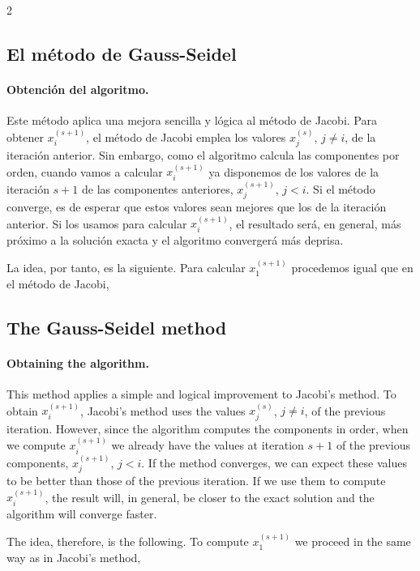\begin{paracol}{2}
\subsection{El método de Gauss-Seidel} 
\paragraph{Obtención del algoritmo.} Este método aplica una mejora sencilla y lógica al método de Jacobi. Para obtener $x_i^{(s+1)}$, el método de Jacobi emplea los valores $x_j^{(s)}$, $j\neq i$, de la iteración anterior. Sin embargo, como el algoritmo calcula las componentes por orden, cuando vamos a calcular $x_i^{(s+1)}$ ya disponemos de los valores de la iteración $s+1$ de las componentes anteriores, $x_j^{(s+1)}$, $j<i$. Si el método converge, es de esperar que estos valores sean mejores que los de la iteración anterior. Si los usamos para calcular $x_i^{(s+1)}$, el resultado será, en general, más próximo a la solución exacta y el algoritmo convergerá más deprisa.

La idea, por tanto, es la siguiente. Para calcular $x_1^{(s+1)}$ procedemos igual que en el método de Jacobi,

\switchcolumn
\subsection{The Gauss-Seidel method} 
\paragraph{Obtaining the algorithm.} This method applies a simple and logical improvement to Jacobi's method. To obtain $x_i^{(s+1)}$, Jacobi's method uses the values $x_j^{(s)}$, $j\neq i$, of the previous iteration. However, since the algorithm computes the components in order, when we compute $x_i^{(s+1)}$ we already have the values at iteration $s+1$ of the previous components, $x_j^{(s+1)}$, $j<i$. If the method converges, we can expect these values to be better than those of the previous iteration. If we use them to compute $x_i^{(s+1)}$, the result will, in general, be closer to the exact solution and the algorithm will converge faster.

The idea, therefore, is the following. To compute $x_1^{(s+1)}$ we proceed in the same way as in Jacobi's method,
\end{paracol}

